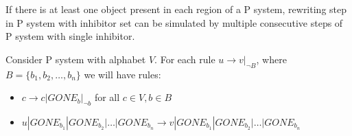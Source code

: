 \begin{lema}
\label{lemma:inhibitor_step}
  If there is at least one object present in each region of a P system, rewriting step in P system with inhibitor set can be simulated by multiple consecutive steps of P system with single inhibitor.
\end{lema}

\begin{dokaz}
  Consider P system with alphabet $V$.
  For each rule $u\rightarrow v|_{\neg B}$, where $B=\{b_1, b_2, \dots ,b_n\}$ we will have rules:
  \begin{itemize}
    \item $c \rightarrow c|GONE_{b}|_{\neg b}$ for all $ c\in V, b\in B$
    \item $u|GONE_{b_1}|GONE_{b_2}|\dots|GONE_{b_n} \rightarrow v|GONE_{b_1}|GONE_{b_2}|\dots|GONE_{b_n}$
  \end{itemize}
\end{dokaz}
